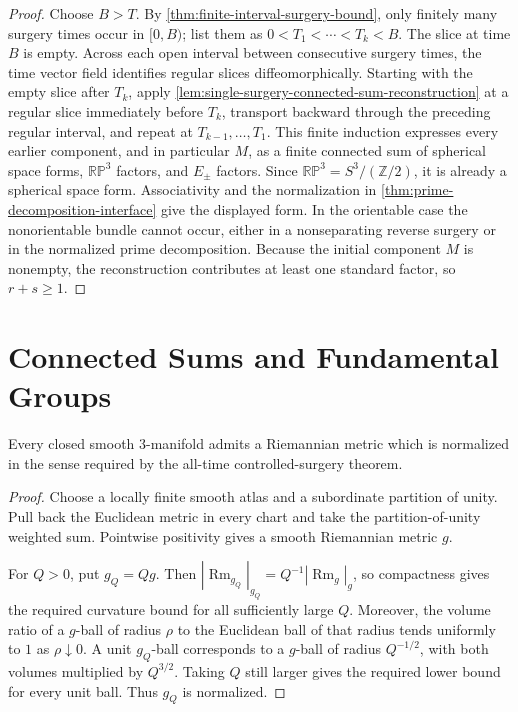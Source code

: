 \begin{proof}
Choose $B>T$.  By \ref{thm:finite-interval-surgery-bound}, only finitely many
surgery times occur in $[0,B)$; list them as
$0<T_1<\cdots<T_k<B$.  The slice at time $B$ is empty.  Across each open
interval between consecutive surgery times, the time vector field identifies
regular slices diffeomorphically.  Starting with the empty slice after $T_k$,
apply \ref{lem:single-surgery-connected-sum-reconstruction} at a regular slice
immediately before $T_k$, transport backward through the preceding regular
interval, and repeat at $T_{k-1},\ldots,T_1$.
This finite induction expresses every earlier component, and in particular
$M$, as a finite connected sum of spherical space forms, $\mathbb{RP}^3$
factors, and $E_\pm$ factors.  Since
$\mathbb{RP}^3=S^3/(\mathbb Z/2)$, it is already a spherical space form.
Associativity and the normalization in
\ref{thm:prime-decomposition-interface} give the displayed form.  In the
orientable case the nonorientable bundle cannot occur, either in a
nonseparating reverse surgery or in the normalized prime decomposition.
Because the initial component $M$ is nonempty, the reconstruction contributes
at least one standard factor, so $r+s\ge1$.
\end{proof}

\section{Connected Sums and Fundamental Groups}

\begin{lemma}
\label{lem:normalized-initial-metric-exists}
\notready
Every closed smooth $3$-manifold admits a Riemannian metric which is normalized
in the sense required by the all-time controlled-surgery theorem.
\end{lemma}

\begin{proof}
Choose a locally finite smooth atlas and a subordinate partition of unity.
Pull back the Euclidean metric in every chart and take the partition-of-unity
weighted sum.  Pointwise positivity gives a smooth Riemannian metric $g$.

For $Q>0$, put $g_Q=Qg$.  Then
$|\operatorname{Rm}_{g_Q}|_{g_Q}=Q^{-1}|\operatorname{Rm}_g|_g$, so compactness
gives the required curvature bound for all sufficiently large $Q$.  Moreover,
the volume ratio of a $g$-ball of radius $\rho$ to the Euclidean ball of that
radius tends uniformly to $1$ as $\rho\downarrow0$.  A unit $g_Q$-ball
corresponds to a $g$-ball of radius $Q^{-1/2}$, with both volumes multiplied by
$Q^{3/2}$.  Taking $Q$ still larger gives the required lower bound for every
unit ball.  Thus $g_Q$ is normalized.
\end{proof}

